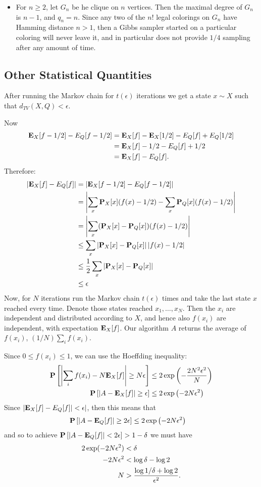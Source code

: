 \documentclass[11pt]{article} \usepackage{amssymb}
\newcommand{\E}{{\bf E}} \newcommand{\Cov}{{\bf Cov}}
\begin{document}
\begin{itemize}
\item
For $n \geq 2$, let $G_n$ be he clique on $n$ vertices. Then the maximal degree
of $G_n$ is $n-1$, and $q_n=n$. Since any two of the $n!$ legal colorings on 
$G_n$ have
Hamming distance $n>1$, then a Gibbs sampler started on a particular coloring
will never leave it, and in particular does not provide $1/4$ sampling after
any amount of time.


\end{itemize}
\subsection{Other Statistical Quantities}
After running the Markov chain for $t(\epsilon)$ iterations we get a state
$x \sim X$ such that $d_{TV}(X,Q)<\epsilon$. 

Now
\begin{align*}
  \E_X[f-1/2]-E_Q[f-1/2] &=\E_X[f]-\E_X[1/2]-E_Q[f]+E_Q[1/2]
  \\ &= \E_X[f]-1/2-E_Q[f]+1/2
  \\ &= \E_X[f]-E_Q[f].
\end{align*}
Therefore:
\begin{align*}
  |\E_X[f]-E_Q[f]| &= |\E_X[f-1/2]-E_Q[f-1/2]|
  \\ &= \left|\sum_x\P_X[x](f(x)-1/2)-\sum_x\P_Q[x](f(x)-1/2)\right|
  \\ &= \left|\sum_x(\P_X[x]-\P_Q[x])(f(x)-1/2)\right|
  \\ &\leq \sum_x\left|\P_X[x]-\P_Q[x]\right| |f(x)-1/2|
  \\ &\leq {1\over 2}\sum_x\left|\P_X[x]-\P_Q[x]\right|
  \\ &\leq \epsilon
\end{align*}
Now, for $N$ iterations run the Markov chain $t(\epsilon)$ times and take
the last state $x$ reached every time. Denote those states reached
$x_1,\ldots,x_N$. Then the $x_i$ are independent and distributed according
to $X$, and hence also $f(x_i)$ are independent, with expectation $\E_X[f]$. Our
algorithm $A$ returns the average of $f(x_i)$, $(1/N)\sum_i f(x_i)$.

Since $0 \leq f(x_i) \leq 1$, we can use the Hoeffding inequality:
\begin{align*}
  \P\left[\left|\sum_if(x_i)-N\E_X[f]\right|\geq N\epsilon\right] &\leq 
    2\exp\left(-{2N^2\epsilon^2\over N}\right)
\\   \P\left[\left|A-\E_X[f]\right|\geq \epsilon\right] &\leq 
    2\exp\left(-2N\epsilon^2\right)
\end{align*}
Since $|\E_X[f]-E_Q[f]|<\epsilon|$, then this means that
\begin{align*}
   \P\left[\left|A-\E_Q[f]\right|\geq 2\epsilon\right] &\leq 
    2\exp\left(-2N\epsilon^2\right)
\end{align*}
and so to achieve $\P\left[\left|A-\E_Q[f]\right| < 2\epsilon\right]>1-\delta$
we must have
\begin{align*}
  2\exp(-2N\epsilon^2)&<\delta
  \\ -2N\epsilon^2&<\log\delta-\log 2
  \\ N &> {\log 1/\delta+\log 2\over \epsilon^2}.
\end{align*}
\end{document}
